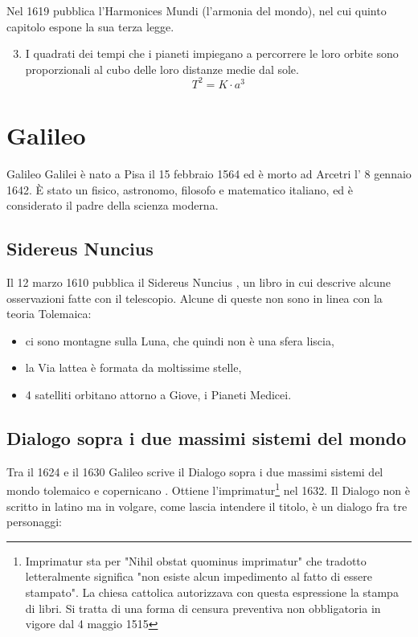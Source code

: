 \documentclass[a4paper]{scrartcl}
\begin{document}
Nel 1619 pubblica l'Harmonices Mundi (l'armonia del mondo), nel cui quinto capitolo espone la sua terza legge.

\begin{enumerate}
	\setcounter{enumi}{2}
 	\item I quadrati dei tempi che i pianeti impiegano a percorrere le loro orbite sono proporzionali al cubo delle loro distanze medie dal sole.
 	\[ T^ 2=K\cdot a^3 \]
\end{enumerate}


\section{Galileo}

Galileo Galilei è nato a Pisa il 15 febbraio 1564 ed è morto ad Arcetri l' 8 gennaio 1642.
È stato un fisico, astronomo, filosofo e matematico italiano, ed è considerato il padre della scienza moderna.



\subsection{Sidereus Nuncius}

Il 12 marzo 1610 pubblica il Sidereus Nuncius \autocite{galileo:nuncius}, un libro in cui descrive alcune osservazioni fatte con il telescopio. Alcune di queste non sono in linea con la teoria Tolemaica:
\begin{itemize}
	\item ci sono montagne sulla Luna, che quindi non è una sfera liscia,
	\item la Via lattea è formata da moltissime stelle,
	\item 4 satelliti orbitano attorno a Giove, i Pianeti Medicei.
\end{itemize}


\subsection{Dialogo sopra i due massimi sistemi del mondo}

Tra il 1624 e il 1630 Galileo scrive il Dialogo sopra i due massimi sistemi del mondo tolemaico e copernicano \autocite{galileo:dialogo}.
Ottiene l'imprimatur\footnote{Imprimatur sta per "Nihil obstat quominus imprimatur" che tradotto letteralmente significa "non esiste alcun impedimento al fatto di essere stampato". La chiesa cattolica autorizzava con questa espressione la stampa di libri. Si tratta di una forma di censura preventiva non obbligatoria in vigore dal 4 maggio 1515} nel 1632.
Il Dialogo non è scritto in latino ma in volgare, come lascia intendere il titolo, è un dialogo fra tre personaggi:
\end{document}
